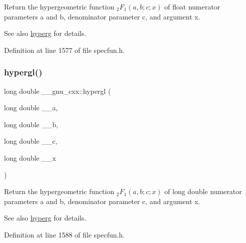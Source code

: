 Return the hypergeometric function $ {}_2F_1(a,b;c;x) $ of {\ttfamily float} numerator parameters {\ttfamily a} and {\ttfamily b}, denominator parameter {\ttfamily c}, and argument {\ttfamily x}.

\begin{DoxySeeAlso}{See also}
\hyperlink{group__mathsf__gnu_ga374198e4076f9e23f3878ca3af70e6da}{hyperg} for details. 
\end{DoxySeeAlso}


Definition at line 1577 of file specfun.\+h.

\mbox{\label{group__mathsf__gnu_ga9961967087216e97f76283f29e1be152}} 
\subsubsection{\texorpdfstring{hypergl()}{hypergl()}}
{\footnotesize\ttfamily long double \+\_\+\+\_\+gnu\+\_\+cxx\+::hypergl (\begin{DoxyParamCaption}\item[{long double}]{\+\_\+\+\_\+a,  }\item[{long double}]{\+\_\+\+\_\+b,  }\item[{long double}]{\+\_\+\+\_\+c,  }\item[{long double}]{\+\_\+\+\_\+x }\end{DoxyParamCaption})\hspace{0.3cm}{\ttfamily [inline]}}

Return the hypergeometric function $ {}_2F_1(a,b;c;x) $ of {\ttfamily long double} numerator parameters {\ttfamily a} and {\ttfamily b}, denominator parameter {\ttfamily c}, and argument {\ttfamily x}.

\begin{DoxySeeAlso}{See also}
\hyperlink{group__mathsf__gnu_ga374198e4076f9e23f3878ca3af70e6da}{hyperg} for details. 
\end{DoxySeeAlso}


Definition at line 1588 of file specfun.\+h.

\mbox{\label{group__mathsf__gnu_ga1fa9e260ba85fc043e3d2ada99c0143c}} 

